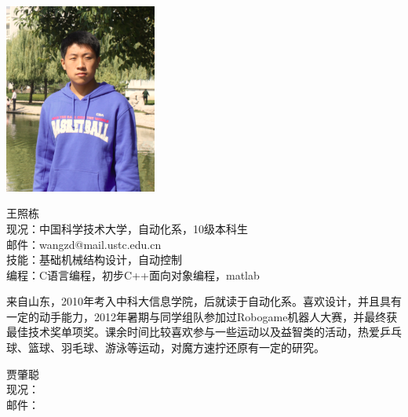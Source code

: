 
\begin{framed}
\noindent \includegraphics[width=50mm]{Figures/context.pic.png}
\parbox[b]{0.6\textwidth}{王照栋\\
现况：中国科学技术大学，自动化系，10级本科生\\
邮件：wangzd@mail.ustc.edu.cn\\
技能：基础机械结构设计，自动控制\\
编程：C语言编程，初步C++面向对象编程，matlab\\
}

来自山东，2010年考入中科大信息学院，后就读于自动化系。喜欢设计，并且具有一定的动手能力，2012年暑期与同学组队参加过Robogame机器人大赛，并最终获最佳技术奖单项奖。课余时间比较喜欢参与一些运动以及益智类的活动，热爱乒乓球、篮球、羽毛球、游泳等运动，对魔方速拧还原有一定的研究。
\end{framed}

\begin{framed}
\noindent
\parbox[b]{0.6\textwidth}{贾肇聪\\
现况：\\
邮件：\\
}
\end{framed}


